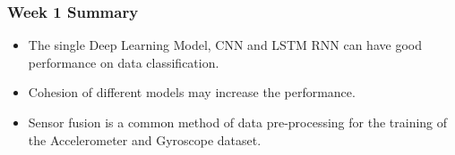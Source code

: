 \documentclass{beamer} %
\begin{document}
\begin{frame}
\frametitle{Week 1 Summary}

\begin{itemize}
\item The single Deep Learning Model, CNN and LSTM RNN can have good performance on data classification.

\item Cohesion of different models may increase the performance.

\item Sensor fusion is a common method of data pre-processing for the training of the Accelerometer and Gyroscope dataset. 
\end{itemize}

\end{frame}
\end{document}
